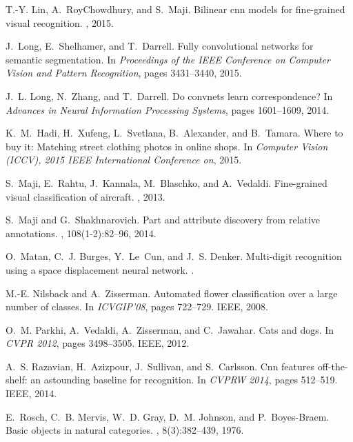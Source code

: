 \documentclass[10pt,twocolumn,letterpaper]{article}
\begin{document}
\begin{thebibliography}{10}
T.-Y. Lin, A.~RoyChowdhury, and S.~Maji.
\newblock Bilinear cnn models for fine-grained visual recognition.
, 2015.

J.~Long, E.~Shelhamer, and T.~Darrell.
\newblock Fully convolutional networks for semantic segmentation.
\newblock In {\em Proceedings of the IEEE Conference on Computer Vision and
  Pattern Recognition}, pages 3431--3440, 2015.

J.~L. Long, N.~Zhang, and T.~Darrell.
\newblock Do convnets learn correspondence?
\newblock In {\em Advances in Neural Information Processing Systems}, pages
  1601--1609, 2014.

K.~M.~Hadi, H.~Xufeng, L.~Svetlana, B.~Alexander, and B.~Tamara.
\newblock Where to buy it: Matching street clothing photos in online shops.
\newblock In {\em Computer Vision (ICCV), 2015 IEEE International Conference
  on}, 2015.

S.~Maji, E.~Rahtu, J.~Kannala, M.~Blaschko, and A.~Vedaldi.
\newblock Fine-grained visual classification of aircraft.
, 2013.

S.~Maji and G.~Shakhnarovich.
\newblock Part and attribute discovery from relative annotations.
, 108(1-2):82--96,
  2014.

O.~Matan, C.~J. Burges, Y.~Le~Cun, and J.~S. Denker.
\newblock Multi-digit recognition using a space displacement neural network.
.

M.-E. Nilsback and A.~Zisserman.
\newblock Automated flower classification over a large number of classes.
\newblock In {\em ICVGIP'08}, pages 722--729. IEEE, 2008.

O.~M. Parkhi, A.~Vedaldi, A.~Zisserman, and C.~Jawahar.
\newblock Cats and dogs.
\newblock In {\em CVPR 2012}, pages 3498--3505. IEEE, 2012.

A.~S. Razavian, H.~Azizpour, J.~Sullivan, and S.~Carlsson.
\newblock Cnn features off-the-shelf: an astounding baseline for recognition.
\newblock In {\em CVPRW 2014}, pages 512--519. IEEE, 2014.

E.~Rosch, C.~B. Mervis, W.~D. Gray, D.~M. Johnson, and P.~Boyes-Braem.
\newblock Basic objects in natural categories.
, 8(3):382--439, 1976.


\end{thebibliography}
\end{document}
